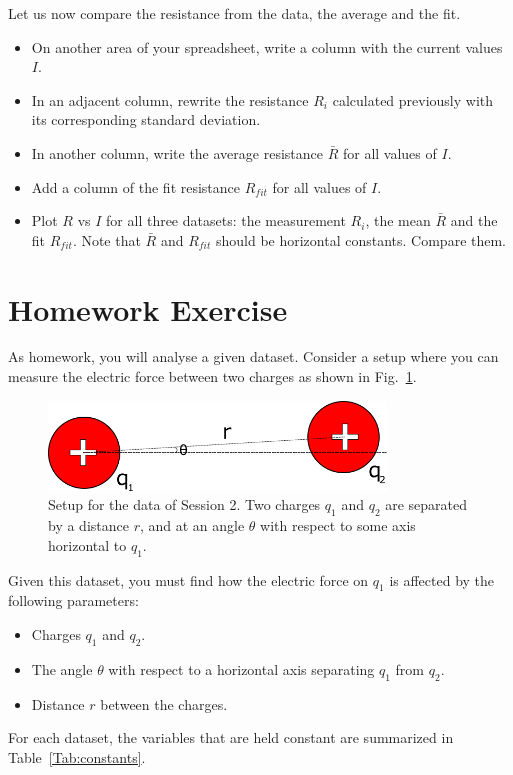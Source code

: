 \documentclass[12pt]{article}
\begin{document}
\noindent Let us now compare the resistance from the data, the average and the fit.
\begin{itemize}
\item On another area of your spreadsheet, write a column with the current values $I$. 
\item In an adjacent column, rewrite the resistance $R_i$ calculated previously with its corresponding standard deviation.
\item In another column, write the average resistance $\bar{R}$ for all values of $I$.
\item Add a column of the fit resistance $R_{fit}$ for all values of $I$.
\item Plot $R$ vs $I$ for all three datasets: the measurement $R_i$, the mean $\bar{R}$ and the fit $R_{fit}$. Note that $\bar{R}$ and $R_{fit}$ should be horizontal constants. Compare them.
\end{itemize}

\section{Homework Exercise}
As homework, you will analyse a given dataset. Consider a setup where you can measure the electric force between two charges as shown in Fig.~\ref{Fig:lab0-session2-setup}. 
\begin{figure}[h]
\centering
\includegraphics[width=0.8\textwidth]{lab0-session2}
\caption{Setup for the data of Session 2. Two charges $q_1$ and $q_2$ are separated by a distance $r$, and at an angle $\theta$ with respect to some axis horizontal to $q_1$.}
\label{Fig:lab0-session2-setup}
\end{figure}

Given this dataset, you must find how the electric force on $q_1$ is affected by the following parameters:
\begin{itemize}
\item Charges $q_1$ and $q_2$.
\item The angle $\theta$ with respect to a horizontal axis separating $q_1$ from $q_2$.
\item Distance $r$ between the charges.
\end{itemize}
For each dataset, the variables that are held constant are summarized in Table~\ref{Tab:constants}. 
\end{document}
